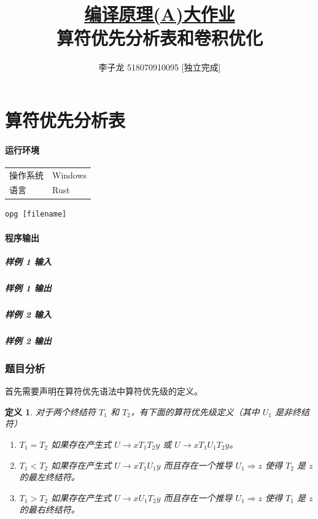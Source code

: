 \documentclass[UTF8]{article}
\title{\normalsize\underline{编译原理(A)大作业}\\\Large 算符优先分析表和卷积优化}
\author{李子龙 518070910095 [独立完成]}
\newtheorem{definition}{定义}
\begin{document}
    \maketitle 
    \tableofcontents
    \clearpage

\part{算符优先分析表}
\subsection*{运行环境}
\begin{tabular}{ll}
    操作系统 & Windows \\
    语言 & Rust\cite{SteveKlabnik2019} \\
\end{tabular}
\vspace*{1em}
\begin{lstlisting}[frameround=fttt]
    opg [filename]
\end{lstlisting}
\subsection*{程序输出}
\subsubsection*{样例 1 输入}

\subsubsection*{样例 1 输出}

\subsubsection*{样例 2 输入}

\subsubsection*{样例 2 输出}


\section{题目分析}

首先需要声明在算符优先语法中算符优先级的定义\cite{Floyd1963}。
\begin{definition}\label{def:op}
    对于两个终结符 $T_1$ 和 $T_2$，有下面的算符优先级定义（其中 $U_1$ 是非终结符）
    \begin{enumerate}
        \item $T_1=T_2$ 如果存在产生式 $U\rightarrow xT_1T_2y$ 或 $U\rightarrow xT_1 U_1 T_2 y$。
        \item $T_1<T_2$ 如果存在产生式 $U\rightarrow xT_1U_1y$ 而且存在一个推导 $U_1\Rightarrow z$ 使得 $T_2$ 是 $z$ 的最左终结符。
        \item $T_1>T_2$ 如果存在产生式 $U\rightarrow xU_1T_2y$ 而且存在一个推导 $U_1\Rightarrow z$ 使得 $T_1$ 是 $z$ 的最右终结符。
    \end{enumerate}
\end{definition}
\end{document}

